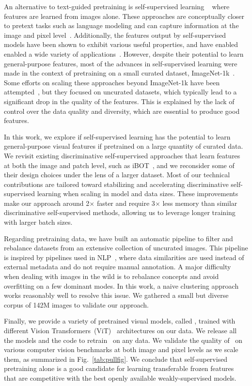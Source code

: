 An alternative to text-guided pretraining is self-supervised learning ~\citep{caron2018deep, chen2020simple, he2021masked} where features are learned from images alone. 
These approaches are conceptually closer to pretext tasks such as language modeling and can capture information at the image and pixel level~\citep{caron2021emerging}.
Additionally, the features output by self-supervised models have been shown to exhibit various useful properties, and have enabled enabled a wide variety of applications~\citep{amir2021deep, tumanyan2022splicing, ofri2023neural, hamilton2022unsupervised}.
However, despite their potential to learn general-purpose features, most of the advances in self-supervised learning were made in the context of pretraining on a small curated dataset, ImageNet-1k~\citep{russakovsky2015imagenet}.
Some efforts on scaling these approaches beyond ImageNet-1k have been attempted~\citep{caron2019unsupervised, goyal2021self,goyal2022vision}, but they focused on uncurated datasets, which typically lead to a significant drop in the quality of the features.
This is explained by the lack of control over the data quality and diversity, which are essential to produce good features.

In this work, we explore if self-supervised learning has the potential to learn general-purpose visual features if pretrained on a large quantity of curated data.
We revisit existing discriminative self-supervised approaches that learn features at both the image and patch level, such as iBOT~\citep{zhou2021ibot}, and we reconsider some of their design choices under the lens of a larger dataset.
Most of our technical contributions are tailored toward stabilizing and accelerating discriminative self-supervised learning when scaling in model and data sizes.
These improvements make our approach around 2$\times$ faster and require 3$\times$ less memory than similar discriminative self-supervised methods, allowing us to leverage longer training with larger batch sizes. 

Regarding pretraining data, we have built an automatic pipeline to filter and rebalance datasets from an extensive collection of uncurated images.
This pipeline is inspired by pipelines used in NLP~\citep{wenzek2019ccnet}, where data similarities are used instead of external metadata and do not require manual annotation.
A major difficulty when dealing with images in the wild is to rebalance concepts and avoid overfitting on a few dominant modes.
In this work, a naive clustering approach works reasonably well to resolve this issue.
We gathered a small but diverse corpus of 142M images to validate our approach.

Finally, we provide a variety of pretrained visual models, called \OURS, trained with different Vision Transformers~(ViT)~\citep{dosovitskiy2016discriminative} architectures on our data.
We release all the models and the code to retrain \OURS~on any data. 
We validate the quality of \OURS~on various computer vision benchmarks at both image and pixel levels as we scale them, as summarized in Fig.~\ref{tab:pullfig}.
We conclude that self-supervised pretraining alone is a good candidate for learning transferable frozen features that are competitive with the best openly available weakly-supervised models.
